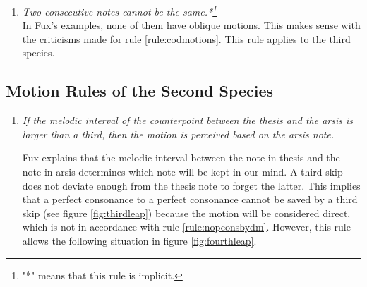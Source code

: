 \begin{enumerate}[wide, label=\bfseries 2.M\arabic*]
    \item\label{rule:notsamecons} \textit{Two consecutive notes cannot be the same.*\footnote{"*" means that this rule is implicit.}}\\
    In Fux's examples, none of them have oblique motions. This makes sense with the criticisms made for rule \ref{rule:codmotions}. This rule applies to the third species.
\end{enumerate}

\subsection{Motion Rules of the Second Species}
\begin{enumerate}[wide, label=\bfseries 2.P\arabic*]
    \item\label{rule:motion2nd} \textit{If the melodic interval of the counterpoint between the thesis and the arsis is larger than a third, then the motion is perceived based on the arsis note.} \parencite[p.65-67]{GaPFr}

    Fux explains that the melodic interval between the note in thesis and the note in arsis determines which note will be kept in our mind. A third skip does not deviate enough from the thesis note to forget the latter. This implies that a perfect consonance to a perfect consonance cannot be saved by a third skip (see figure \ref{fig:thirdleap}) because the motion will be considered direct, which is not in accordance with rule \ref{rule:nopconsbydm}. However, this rule allows the following situation in figure \ref{fig:fourthleap}.


\end{enumerate}
